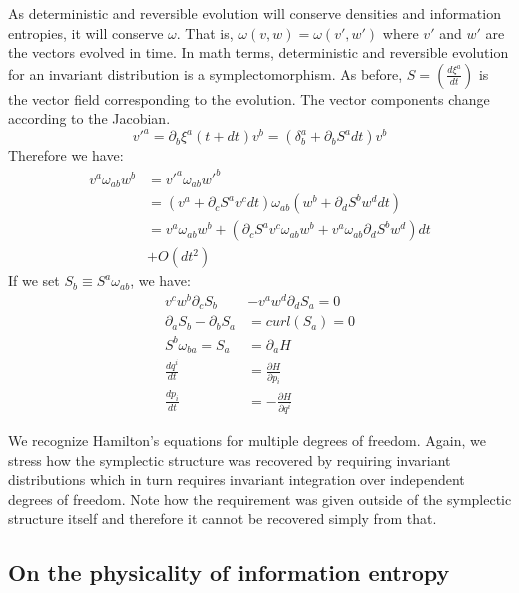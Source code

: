 \documentclass[11pt]{elsarticle}
\begin{document}
As deterministic and reversible evolution will conserve densities and information entropies, it will conserve $\omega$. That is, $\omega(v, w) = \omega(v',w')$ where $v'$ and $w'$ are the vectors evolved in time. In math terms, deterministic and reversible evolution for an invariant distribution is a symplectomorphism. As before, $S = \left(\frac{d\xi^a}{dt}\right)$ is the vector field corresponding to the evolution. The vector components change according to the Jacobian.
\begin{equation}
	v'^a = \partial_b \xi^a(t+dt) v^b = (\delta^a_b + \partial_b S^a dt) v^b
\end{equation}
Therefore we have:
\begin{align*}
v^{a} \omega_{ab} w^{b} &= v'^{a} \omega_{ab} w'^{b}  \\
&= (v^{a} + \partial_{c} S^{a} v^{c} dt) \omega_{ab} ( w^{b} + \partial_{d} S^{b} w^{d} dt) \\
&= v^{a} \omega_{ab} w^{b} + (\partial_{c} S^{a} v^{c} \omega_{ab} w^{b} + v^{a} \omega_{ab} \partial_{d} S^{b} w^{d}) dt \\ &+ O(dt^2)
\end{align*}
If we set $S_{b} \equiv S^{a} \omega_{ab}$, we have:
\begin{equation}
\begin{aligned}
v^{c} w^{b} \partial_{c} S_{b} &- v^{a} w^{d} \partial_{d} S_{a} = 0\\
\partial_{a} S_{b} - \partial_{b} S_{a} &= curl(S_{a}) = 0 \\
S^{b} \omega_{ba} = S_{a} &= \partial_{a}H \\
\frac{dq^i}{dt} &= \frac{\partial H}{\partial p_i}  \\
\frac{dp_i}{dt} &= - \frac{\partial H}{\partial q^i}
\end{aligned}
\end{equation}

We recognize Hamilton's equations for multiple degrees of freedom. Again, we stress how the symplectic structure was recovered by requiring invariant distributions which in turn requires invariant integration over independent degrees of freedom. Note how the requirement was given outside of the symplectic structure itself and therefore it cannot be recovered simply from that.

\subsection*{On the physicality of information entropy}
\end{document}
